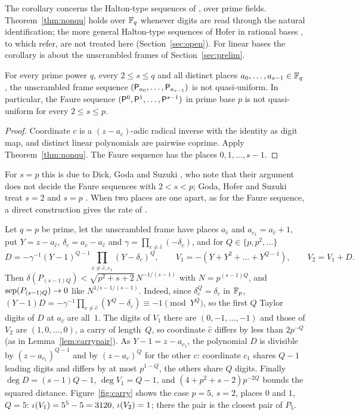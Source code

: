 The corollary concerns the Halton-type sequences of \cite[Def.~2]{GHS26}, over prime fields. Theorem~\ref{thm:nonqu} holds over $\mathbb{F}_q$ whenever digits are read through the natural identification; the more general Halton-type sequences of Hofer in rational bases \cite{Hof18}, to which \cite{GHS26} refer, are not treated here (Section~\ref{sec:open}). For linear bases the corollary is about the unscrambled frames of Section~\ref{sec:prelim}.

\begin{corollary}\label{cor:faure}
For every prime power $q$, every $2\le s\le q$ and all distinct places $a_0,\dots,a_{s-1}\in\mathbb{F}_q$, the unscrambled frame sequence $(\mathsf{P}_{a_0},\dots,\mathsf{P}_{a_{s-1}})$ is not quasi-uniform. In particular, the Faure sequence $(\mathsf{P}^0,\mathsf{P}^1,\dots,\mathsf{P}^{s-1})$ in prime base $p$ is not quasi-uniform for every $2\le s\le p$.
\end{corollary}

\begin{proof}
Coordinate $c$ is a $(z-a_c)$-adic radical inverse with the identity as digit map, and distinct linear polynomials are pairwise coprime. Apply Theorem~\ref{thm:nonqu}. The Faure sequence has the places $0,1,\dots,s-1$.
\end{proof}

For $s=p$ this is due to Dick, Goda and Suzuki \cite{DGS2}, who note that their argument does not decide the Faure sequences with $2<s<p$; Goda, Hofer and Suzuki treat $s=2$ and $s=p$ \cite{GHS26}. When two places are one apart, as for the Faure sequence, a direct construction gives the rate of \cite{GHS26}.

\begin{remark}\label{rem:faurerate}
Let $q=p$ be prime, let the unscrambled frame have places $a_{\hat c}$ and $a_{c_1}=a_{\hat c}+1$, put $Y=z-a_{\hat c}$, $\delta_c=a_c-a_{\hat c}$ and $\gamma=\prod_{c\ne\hat c}(-\delta_c)$, and for $Q\in\{p,p^2,\dots\}$
\[
D=-\gamma^{-1}(Y-1)^{Q-1}\prod_{c\ne\hat c,c_1}(Y-\delta_c)^Q,\qquad V_1=-(Y+Y^2+\dots+Y^{Q-1}),\qquad V_2=V_1+D .
\]
Then $\delta(P_{(s-1)Q})<\sqrt{p^2+s+2}\,N^{-1/(s-1)}$ with $N=p^{(s-1)Q}$, and $\operatorname{sep}(P_{(s-1)Q})\to0$ like $N^{1/s-1/(s-1)}$. Indeed, since $\delta_c^Q=\delta_c$ in $\mathbb{F}_p$, $(Y-1)D=-\gamma^{-1}\prod_{c\ne\hat c}(Y^Q-\delta_c)\equiv-1\pmod{Y^Q}$, so the first $Q$ Taylor digits of $D$ at $a_{\hat c}$ are all~$1$. The digits of $V_1$ there are $(0,-1,\dots,-1)$ and those of $V_2$ are $(1,0,\dots,0)$, a carry of length~$Q$, so coordinate $\hat c$ differs by less than $2p^{-Q}$ (as in Lemma~\ref{lem:carrypair}). As $Y-1=z-a_{c_1}$, the polynomial $D$ is divisible by $(z-a_{c_1})^{Q-1}$ and by $(z-a_c)^Q$ for the other $c$: coordinate $c_1$ shares $Q-1$ leading digits and differs by at most $p^{1-Q}$, the others share $Q$ digits. Finally $\deg D=(s-1)Q-1$, $\deg V_1=Q-1$, and $(4+p^2+s-2)p^{-2Q}$ bounds the squared distance. Figure~\ref{fig:carry} shows the case $p=5$, $s=2$, places $0$ and $1$, $Q=5$: $\iota(V_1)=5^5-5=3120$, $\iota(V_2)=1$; there the pair is the closest pair of $P_5$.
\end{remark}

